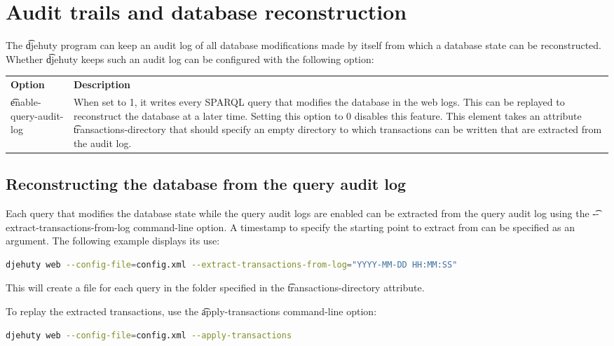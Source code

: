 \section{Audit trails and database reconstruction}

  The \t{djehuty} program can keep an audit log of all database modifications
  made by itself from which a database state can be reconstructed.  Whether
  \t{djehuty} keeps such an audit log can be configured with the following
  option:

\begin{tabularx}{\textwidth}{*{1}{!{\VRule[-1pt]}l}!{\VRule[-1pt]}X}
  \headrow
  \textbf{Option}            & \textbf{Description}\\
  \t{enable-query-audit-log} & When set to 1, it writes every SPARQL query that
                               modifies the database in the web logs.  This can
                               be replayed to reconstruct the database at a
                               later time.  Setting this option to 0 disables
                               this feature.  This element takes an attribute
                               \t{transactions-directory} that should specify
                               an empty directory to which transactions can be
                               written that are extracted from the audit log.
\end{tabularx}

\subsection{Reconstructing the database from the query audit log}

  Each query that modifies the database state while the query audit logs
  are enabled can be extracted from the query audit log using the
  \t{-{}-extract-transactions-from-log} command-line option.  A timestamp to
  specify the starting point to extract from can be specified as an argument.
  The following example displays its use:

\begin{lstlisting}[language=bash]
djehuty web --config-file=config.xml --extract-transactions-from-log="YYYY-MM-DD HH:MM:SS"
\end{lstlisting}

This will create a file for each query in the folder specified in the
\t{transactions-directory} attribute.

  To replay the extracted transactions, use the \t{apply-transactions}
  command-line option:
\begin{lstlisting}[language=bash]
djehuty web --config-file=config.xml --apply-transactions
\end{lstlisting}

